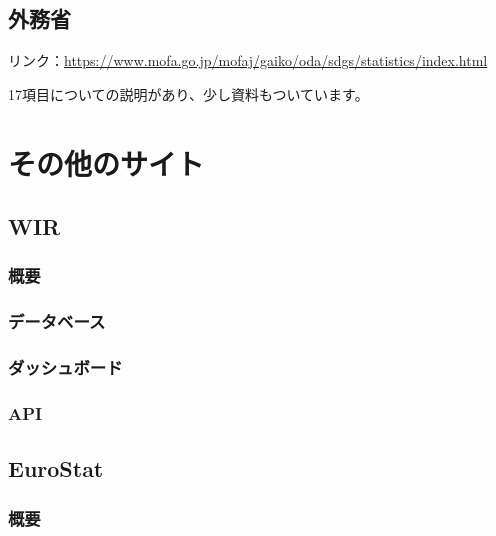 \documentclass[
  xelatex, ja=standard]{bxjsbook}
\theoremstyle{definition}
\theoremstyle{definition}
\theoremstyle{definition}
\theoremstyle{definition}
\theoremstyle{remark}
\begin{document}
\hypertarget{ux5916ux52d9ux7701}{%
\section{外務省}\label{ux5916ux52d9ux7701}}

リンク：\url{https://www.mofa.go.jp/mofaj/gaiko/oda/sdgs/statistics/index.html}

17項目についての説明があり、少し資料もついています。

\hypertarget{other-site}{%
\chapter{その他のサイト}\label{other-site}}

\hypertarget{wir}{%
\section{WIR}\label{wir}}

\hypertarget{ux6982ux8981-7}{%
\subsection{概要}\label{ux6982ux8981-7}}

\hypertarget{ux30c7ux30fcux30bfux30d9ux30fcux30b9-5}{%
\subsection{データベース}\label{ux30c7ux30fcux30bfux30d9ux30fcux30b9-5}}

\hypertarget{ux30c0ux30c3ux30b7ux30e5ux30dcux30fcux30c9-5}{%
\subsection{ダッシュボード}\label{ux30c0ux30c3ux30b7ux30e5ux30dcux30fcux30c9-5}}

\hypertarget{api-5}{%
\subsection{API}\label{api-5}}

\hypertarget{eurostat}{%
\section{EuroStat}\label{eurostat}}

\hypertarget{ux6982ux8981-8}{%
\subsection{概要}\label{ux6982ux8981-8}}
\end{document}
